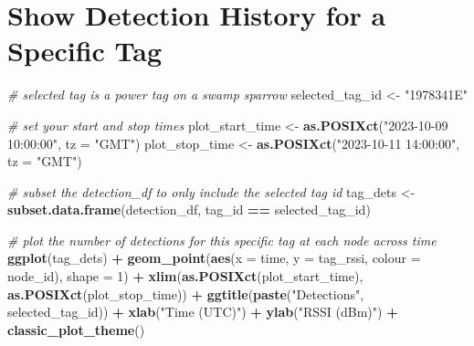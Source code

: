 \documentclass[
]{book}
\newenvironment{Shaded}{\begin{snugshade}}{\end{snugshade}}
\newcommand{\AttributeTok}[1]{\textcolor[rgb]{0.13,0.29,0.53}{#1}}
\newcommand{\CommentTok}[1]{\textcolor[rgb]{0.56,0.35,0.01}{\textit{#1}}}
\newcommand{\DecValTok}[1]{\textcolor[rgb]{0.00,0.00,0.81}{#1}}
\newcommand{\FunctionTok}[1]{\textcolor[rgb]{0.13,0.29,0.53}{\textbf{#1}}}
\newcommand{\NormalTok}[1]{#1}
\newcommand{\OtherTok}[1]{\textcolor[rgb]{0.56,0.35,0.01}{#1}}
\newcommand{\SpecialCharTok}[1]{\textcolor[rgb]{0.81,0.36,0.00}{\textbf{#1}}}
\newcommand{\StringTok}[1]{\textcolor[rgb]{0.31,0.60,0.02}{#1}}
\begin{document}
\section{Show Detection History for a Specific Tag}\label{show-detection-history-for-a-specific-tag}

\begin{Shaded}
\begin{Highlighting}[]
\CommentTok{\# selected tag is a power tag on a swamp sparrow}
\NormalTok{selected\_tag\_id }\OtherTok{\textless{}{-}} \StringTok{"1978341E"}

\CommentTok{\# set your start and stop times}
\NormalTok{plot\_start\_time }\OtherTok{\textless{}{-}} \FunctionTok{as.POSIXct}\NormalTok{(}\StringTok{"2023{-}10{-}09 10:00:00"}\NormalTok{, }\AttributeTok{tz =} \StringTok{"GMT"}\NormalTok{)}
\NormalTok{plot\_stop\_time }\OtherTok{\textless{}{-}} \FunctionTok{as.POSIXct}\NormalTok{(}\StringTok{"2023{-}10{-}11 14:00:00"}\NormalTok{, }\AttributeTok{tz =} \StringTok{"GMT"}\NormalTok{)}

\CommentTok{\# subset the detection\_df to only include the selected tag id}
\NormalTok{tag\_dets }\OtherTok{\textless{}{-}} \FunctionTok{subset.data.frame}\NormalTok{(detection\_df, tag\_id }\SpecialCharTok{==}\NormalTok{ selected\_tag\_id)}

\CommentTok{\# plot the number of detections for this specific tag at each node across time}
\FunctionTok{ggplot}\NormalTok{(tag\_dets) }\SpecialCharTok{+}
  \FunctionTok{geom\_point}\NormalTok{(}\FunctionTok{aes}\NormalTok{(}\AttributeTok{x =}\NormalTok{ time, }
                 \AttributeTok{y =}\NormalTok{ tag\_rssi, }
                 \AttributeTok{colour =}\NormalTok{ node\_id), }
             \AttributeTok{shape =} \DecValTok{1}\NormalTok{) }\SpecialCharTok{+}
  \FunctionTok{xlim}\NormalTok{(}\FunctionTok{as.POSIXct}\NormalTok{(plot\_start\_time), }
       \FunctionTok{as.POSIXct}\NormalTok{(plot\_stop\_time)) }\SpecialCharTok{+}
  \FunctionTok{ggtitle}\NormalTok{(}\FunctionTok{paste}\NormalTok{(}\StringTok{"Detections"}\NormalTok{, }
\NormalTok{                selected\_tag\_id)) }\SpecialCharTok{+}
  \FunctionTok{xlab}\NormalTok{(}\StringTok{"Time (UTC)"}\NormalTok{) }\SpecialCharTok{+}
  \FunctionTok{ylab}\NormalTok{(}\StringTok{"RSSI (dBm)"}\NormalTok{) }\SpecialCharTok{+}
  \FunctionTok{classic\_plot\_theme}\NormalTok{()}
\end{Highlighting}
\end{Shaded}
\end{document}
